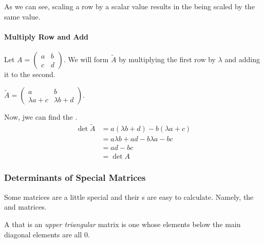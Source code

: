 As we can see, scaling a row by a scalar value results in the  being scaled by the same value.

\paragraph{Multiply Row and Add}
Let $A =
\begin{pmatrix}
  a & b \\
  c & d
\end{pmatrix}$.
We will form $\tilde{A}$ by multiplying the first row by $\lambda$ and adding it to the second.

$\tilde{A} =
\begin{pmatrix}
  a & b \\
  \lambda a + c & \lambda b + d
\end{pmatrix}$.

Now, jwe can find the .
\begin{align*}
  \det \tilde{A} &= a(\lambda b + d) - b(\lambda a + c) \\
                 &= a \lambda b + ad - b \lambda a - bc \\
                 &=  ad - bc \\
                 &= \det A
\end{align*}

\subsubsection{Determinants of Special Matrices}\label{subsubsec:Determinants_Special_Matrices}
Some matrices are a little special and their s are easy to calculate.
Namely, the  and  matrices.

\begin{definition}\label{def:Upper_Triangular}
  A  that is an \emph{upper triangular} matrix is one whose elements below the main diagonal elements are all $0$.
\end{definition}


